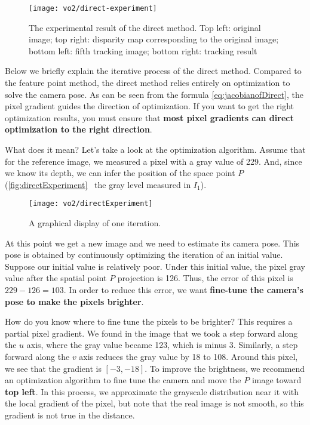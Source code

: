 \begin{figure}[!htp]
\centering
\texttt{[image: vo2/direct-experiment]}
\caption{The experimental result of the direct method. Top left: original image; top right: disparity map corresponding to the original image; bottom left: fifth tracking image; bottom right: tracking result}
\label{fig:direct-experiment}
\end{figure}

Below we briefly explain the iterative process of the direct method. Compared to the feature point method, the direct method relies entirely on optimization to solve the camera pose. As can be seen from the formula \eqref{eq:jacobianofDirect}, the pixel gradient guides the direction of optimization. If you want to get the right optimization results, you must ensure that \textbf{most pixel gradients can direct optimization to the right direction}.

What does it mean? Let's take a look at the optimization algorithm. Assume that for the reference image, we measured a pixel with a gray value of 229. And, since we know its depth, we can infer the position of the space point $P$ (\autoref{fig:directExperiment}~ the gray level measured in $I_1$).

\begin{figure}[!htp]
\centering
\texttt{[image: vo2/directExperiment]}
\caption{A graphical display of one iteration. }
\label{fig:directExperiment}
\end{figure}

At this point we get a new image and we need to estimate its camera pose. This pose is obtained by continuously optimizing the iteration of an initial value. Suppose our initial value is relatively poor. Under this initial value, the pixel gray value after the spatial point $P$ projection is 126. Thus, the error of this pixel is $229-126=103$. In order to reduce this error, we want \textbf{fine-tune the camera's pose to make the pixels brighter}.

How do you know where to fine tune the pixels to be brighter? This requires a partial pixel gradient. We found in the image that we took a step forward along the $u$ axis, where the gray value became 123, which is minus 3. Similarly, a step forward along the $v$ axis reduces the gray value by 18 to 108. Around this pixel, we see that the gradient is $[-3,-18]$. To improve the brightness, we recommend an optimization algorithm to fine tune the camera and move the $P$ image toward \textbf{top left}. In this process, we approximate the grayscale distribution near it with the local gradient of the pixel, but note that the real image is not smooth, so this gradient is not true in the distance.

